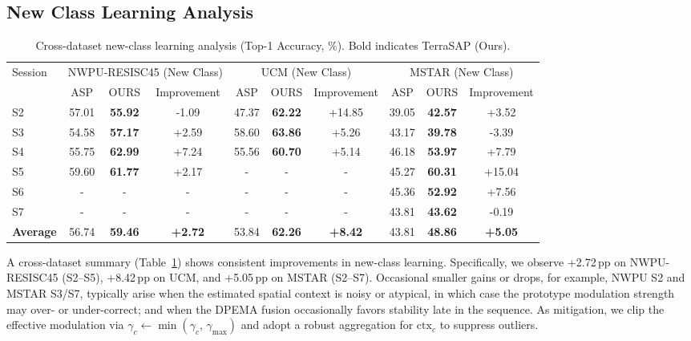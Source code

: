 ﻿\documentclass[letterpaper,journal]{IEEEtran}
\begin{document}
\subsection{New Class Learning Analysis}
\begin{table}[!t]
\centering
\caption{Cross-dataset new-class learning analysis (Top-1 Accuracy, \%). Bold indicates TerraSAP (Ours).}
\label{tab:new_class_learning}
\begin{tabular}{@{}l|ccc|ccc|ccc@{}}
\toprule
\multirow{2}{*}{Session} & \multicolumn{3}{c|}{NWPU-RESISC45 (New Class)} & \multicolumn{3}{c|}{UCM (New Class)} & \multicolumn{3}{c}{MSTAR (New Class)} \\
\cmidrule(lr){2-4} \cmidrule(lr){5-7} \cmidrule(lr){8-10}
& ASP & OURS & Improvement & ASP & OURS & Improvement & ASP & OURS & Improvement \\
\midrule
S2 & 57.01 & \textbf{55.92} & -1.09 & 47.37 & \textbf{62.22} & +14.85 & 39.05 & \textbf{42.57} & +3.52 \\
S3 & 54.58 & \textbf{57.17} & +2.59 & 58.60 & \textbf{63.86} & +5.26 & 43.17 & \textbf{39.78} & -3.39 \\
S4 & 55.75 & \textbf{62.99} & +7.24 & 55.56 & \textbf{60.70} & +5.14 & 46.18 & \textbf{53.97} & +7.79 \\
S5 & 59.60 & \textbf{61.77} & +2.17 & - & - & - & 45.27 & \textbf{60.31} & +15.04 \\
S6 & - & - & - & - & - & - & 45.36 & \textbf{52.92} & +7.56 \\
S7 & - & - & - & - & - & - & 43.81 & \textbf{43.62} & -0.19 \\
\midrule
\textbf{Average} & 56.74 & \textbf{59.46} & \textbf{+2.72} & 53.84 & \textbf{62.26} & \textbf{+8.42} & 43.81 & \textbf{48.86} & \textbf{+5.05} \\
\bottomrule
\end{tabular}
\end{table}


 A cross-dataset summary (Table~\ref{tab:new_class_learning}) shows consistent improvements in new-class learning. Specifically, we observe +2.72\,pp on NWPU-RESISC45 (S2--S5), +8.42\,pp on UCM, and +5.05\,pp on MSTAR (S2--S7). Occasional smaller gains or drops, for example, NWPU S2 and MSTAR S3/S7, typically arise when the estimated spatial context is noisy or atypical, in which case the prototype modulation strength may over- or under-correct; and when the DPEMA fusion occasionally favors stability late in the sequence. As mitigation, we clip the effective modulation via $\gamma_c \leftarrow \min(\gamma_c,\, \gamma_{\max})$ and adopt a robust aggregation for $\mathrm{ctx}_c$ to suppress outliers.
\end{document}
